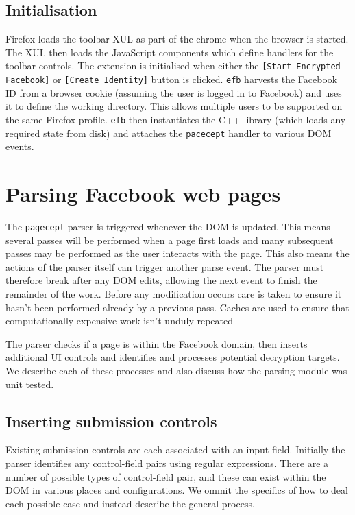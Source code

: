     
\FloatBarrier    
\subsection{Initialisation}

Firefox loads the toolbar XUL as part of the chrome when the browser is started. The XUL then loads the JavaScript components which define handlers for the toolbar controls. The extension is initialised when either the {\tt [Start Encrypted Facebook]} or {\tt [Create Identity]} button is clicked. {\tt efb} harvests the Facebook ID from a browser cookie (assuming the user is logged in to Facebook) and uses it to define the working directory. This allows multiple users to be supported on the same Firefox profile. {\tt efb} then instantiates the C++ library (which loads any required state from disk) and attaches the {\tt pacecept} handler to various DOM events.


\FloatBarrier
\section{Parsing Facebook web pages}

The {\tt pagecept} parser is triggered whenever the DOM is updated. This means several passes will be performed when a page first loads and many subsequent passes may be performed as the user interacts with the page. This also means the actions of the parser itself can trigger another parse event. The parser must therefore break after any DOM edits, allowing the next event to finish the remainder of the work. Before any modification occurs care is taken to ensure it hasn't been performed already by a previous pass. Caches are used to ensure that computationally expensive work isn't unduly repeated

The parser checks if a page is within the Facebook domain, then inserts additional UI controls and identifies and processes potential decryption targets. We describe each of these processes and also discuss how the parsing module was unit tested.


\subsection{Inserting submission controls}
\label{ssec:insert}

Existing submission controls are each associated with an input field. Initially the parser identifies any control-field pairs using regular expressions. There are a number of possible types of control-field pair, and these can exist within the DOM in various places and configurations. We ommit the specifics of how to deal each possible case and instead describe the general process.

